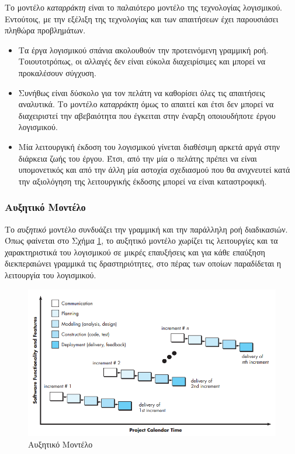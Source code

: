 \documentclass{report}
\begin{document}
Το μοντέλο \textsl{καταρράκτη} είναι το παλαιότερο μοντέλο της τεχνολογίας λογισμικού. Εντούτοις, με την εξέλιξη της τεχνολογίας και των απαιτήσεων έχει παρουσιάσει πληθώρα προβλημάτων.

\begin{itemize}
  \item Τα έργα λογισμικού σπάνια ακολουθούν την προτεινόμενη γραμμική ροή. Τοιουτοτρόπως, οι αλλαγές δεν είναι εύκολα διαχειρίσιμες και μπορεί να προκαλέσουν σύγχυση. 
  \item Συνήθως είναι δύσκολο για τον πελάτη να καθορίσει όλες τις απαιτήσεις αναλυτικά. Το μοντέλο \textsl{καταρράκτη} όμως το απαιτεί και έτσι δεν μπορεί να διαχειριστεί την αβεβαιότητα που έγκειται στην έναρξη οποιουδήποτε έργου λογισμικού.
  \item Μία λειτουργική έκδοση του λογισμικού γίνεται διαθέσιμη αρκετά αργά στην διάρκεια ζωής του έργου. Έτσι, από την μία ο πελάτης πρέπει να είναι υπομονετικός και από την άλλη μία αστοχία σχεδιασμού που θα ανιχνευτεί κατά την αξιολόγηση της λειτουργικής έκδοσης μπορεί να είναι καταστροφική.
\end{itemize}

\subsubsection{Αυξητικό Μοντέλο}

Το \textsl{αυξητικό} μοντέλο συνδυάζει την γραμμική και την παράλληλη ροή διαδικασιών. Όπως φαίνεται στο Σχήμα \ref{fig:incremental_process_model}, το αυξητικό μοντέλο χωρίζει τις λειτουργίες και τα χαρακτηριστικά του λογισμικού σε μικρές επαυξήσεις και για κάθε επαύξηση διεκπεραιώνει γραμμικά τις δραστηριότητες, στο πέρας των οποίων παραδίδεται η λειτουργία του λογισμικού.

\begin{figure}[h]
    \centering
    \includegraphics[scale=2]{images/software_engineering/incremental_process_model.png}
    \caption{Αυξητικό Μοντέλο}
    \label{fig:incremental_process_model}
\end{figure}
\end{document}
